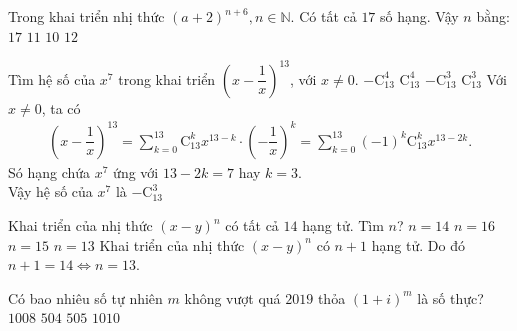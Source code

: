 \begin{ex}%
	Trong khai triển nhị thức $ (a + 2)^{n+6}, n \in \mathbb{N}$. Có tất cả $17$ số hạng. Vậy $n$ bằng:
	\choice
	{$ 17 $}
	{$ 11 $}
	{\True $ 10 $}
	{$ 12 $}
\end{ex}%
\begin{ex}%
 Tìm hệ số của $x^7$ trong khai triển $\left(x-\dfrac{1}{x}\right)^{13}$, với $x\neq 0$.
 \choice
  {$-\mathrm{C}_{13}^4$}
  {$\mathrm{C}_{13}^4$}
  {\True $-\mathrm{C}_{13}^3$}
  {$\mathrm{C}_{13}^3$}
 \loigiai
  {
  Với $x \neq 0$, ta có
  \allowdisplaybreaks
  \begin{eqnarray*}
   \left(x-\dfrac{1}{x}\right)^{13} = \sum\limits_{k=0}^{13}\mathrm{C}_{13}^k x^{13-k} \cdot \left(-\dfrac{1}{x}\right)^k = \sum\limits_{k=0}^{13} (-1)^k \mathrm{C}_{13}^k x^{13-2k}.
  \end{eqnarray*}
  Só hạng chứa $x^7$ ứng với $13-2k=7$ hay $k=3$.\\
  Vậy hệ số của $x^7$ là $-\mathrm{C}_{13}^3$
  }
\end{ex}%
\begin{ex}%
	Khai triển của nhị thức $(x-y)^n$ có tất cả $14$ hạng tử. Tìm $n$?
	\choice
	{$n=14$}
	{$n=16$}
	{$n=15$}
	{\True $n=13$}
	\loigiai
	{Khai triển của nhị thức $(x-y)^n$ có $n+1$ hạng tử. Do đó $n+1=14 \Leftrightarrow n=13$.}
\end{ex}%
\begin{ex}%
Có bao nhiêu số tự nhiên $m$ không vượt quá $2019$ thỏa $(1+i)^m$ là số thực?
\choice
{$1008$}
{$504$}
{\True $505$}
{$1010$}
\end{ex}%
